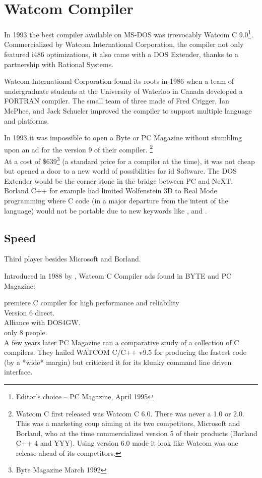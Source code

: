 \section{Watcom Compiler}
In 1993 the best compiler available on MS-DOS was irrevocably Watcom C 9.0\footnote{Editor's choice -- PC Magazine, April 1995}. Commercialized by Watcom International Corporation, the compiler not only featured i486 optimizations, it also came with a DOS Extender,  thanks to a partnership with Rational Systems.\\
\par
Watcom International Corporation found its roots in 1986 when a team of undergraduate students at the University of Waterloo in Canada developed a FORTRAN compiler. The small team of three made of Fred Crigger, Ian McPhee, and Jack Schueler improved the compiler to support multiple language and platforms.\\
\par
In 1993 it was impossible to open a Byte or PC Magazine without stumbling upon an ad for the version 9 of their compiler. \footnote{Watcom C first released was Watcom C 6.0. There was never a 1.0 or 2.0. This was a marketing coup aiming at its two competitors, Microsoft and Borland, who at the time commercialized version 5 of their products (Borland C++ 4 and YYY). Using version 6.0 made it look like Watcom was one release ahead of its competitors.}
\\
At a cost of \$639\footnote{Byte Magazine March 1992} (a standard price for a compiler at the time), it was not cheap but opened a door to a new world of possibilities for id Software. The DOS Extender would be the corner stone in the bridge between PC and NeXT. Borland C++ for example had limited Wolfenstein 3D to Real Mode programming where C code (in a major departure from the intent of the language) would not be portable due to new keywords like , and .\\
\par



\subsection{Speed}
Third player besides Microsoft and Borland.

Introduced in 1988 by , Watcom C Compiler ads found in BYTE and PC Magazine:\\
\par
{}
premiere C compiler for high performance and reliability\\
Version 6 direct.\\
Alliance with DOS4GW.\\
only 8 people.\\
A few years later
PC Magazine ran a comparative study of a collection of C compilers.  They
hailed WATCOM C/C++ v9.5 for producing the fastest code (by a *wide* margin)
but criticized it for its klunky command line driven interface.\\

